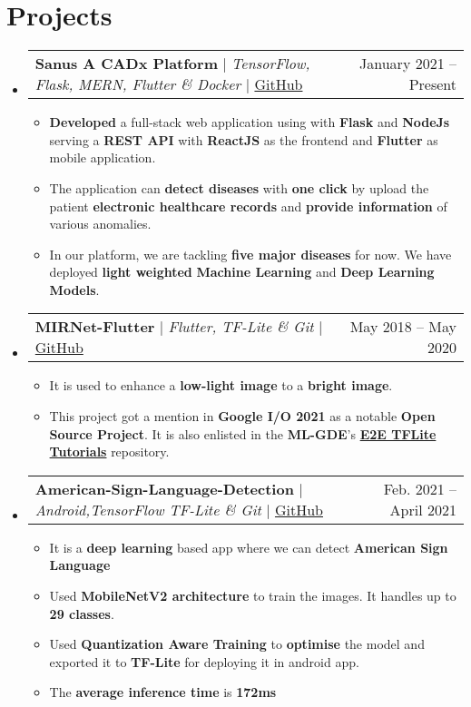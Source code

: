 \documentclass[letterpaper,11pt]{article}
\makeatletter
\newcommand{\resumeItem}[1]{
  \item\small{
    {#1 \vspace{-2pt}}
  }
}
\newcommand{\resumeProjectHeading}[2]{
    \item
    \begin{tabular*}{0.97\textwidth}{l@{\extracolsep{\fill}}r}
      \small#1 & #2 \\
    \end{tabular*}\vspace{-7pt}
}
\newcommand{\resumeSubHeadingListStart}{\begin{itemize}[leftmargin=0.15in, label={}]}
\newcommand{\resumeSubHeadingListEnd}{\end{itemize}}
\newcommand{\resumeItemListStart}{\begin{itemize}}
\newcommand{\resumeItemListEnd}{\end{itemize}\vspace{-5pt}}
\makeatother
\begin{document}
\section{Projects}
    \resumeSubHeadingListStart
      \resumeProjectHeading
          {\textbf{Sanus \- A CADx Platform } $|$ \emph{TensorFlow, Flask, MERN, Flutter \& Docker} $|$ \href{https://github.com/SANUS-ML/SANUS-WEB}{GitHub}}{January 2021 -- Present}
          \resumeItemListStart
            \resumeItem{\textbf{Developed} a full-stack web application using with \textbf{Flask} and \textbf{NodeJs} serving a \textbf{REST API} with \textbf{ReactJS} as the frontend and \textbf{Flutter} as mobile application.}
            \resumeItem{The application can \textbf{detect diseases} with \textbf{one click} by upload the patient \textbf{electronic healthcare records} and \textbf{provide information} of various anomalies.}
            \resumeItem{In our platform, we are tackling \textbf{five major diseases} for now. We have deployed \textbf{light weighted} \textbf{Machine Learning} and \textbf{Deep Learning Models}.}
          \resumeItemListEnd
      \resumeProjectHeading
          {\textbf{MIRNet-Flutter} $|$ \emph{Flutter, TF-Lite \& Git} $|$ \href{https://github.com/sayannath/MIRNet-Flutter}{GitHub}}{May 2018 -- May 2020}
          \resumeItemListStart
            \resumeItem{It is used to enhance a \textbf{low-light image} to a \textbf{bright image}.}
            \resumeItem{This project got a mention in \textbf{Google I/O 2021} as a notable \textbf{Open Source Project}. It is also enlisted in the \textbf{ML-GDE}'s \href{https://github.com/ml-gde/e2e-tflite-tutorials}{\textbf{E2E TFLite Tutorials}} repository.}
          \resumeItemListEnd
      \resumeProjectHeading
          {\textbf{American-Sign-Language-Detection} $|$ \emph{Android,TensorFlow TF-Lite \& Git} $|$ \href{https://github.com/sayannath/American-Sign-Language-Detection}{GitHub}}{Feb. 2021 -- April 2021}
          \resumeItemListStart
            \resumeItem{It is a \textbf{deep learning} based app where we can detect \textbf{American Sign Language}}
            \resumeItem{Used \textbf{MobileNetV2 architecture} to train the images. It handles up to \textbf{29 classes}.}
            \resumeItem{Used \textbf{Quantization Aware Training} to \textbf{optimise} the model and exported it to \textbf{TF-Lite} for deploying it in android app.}
            \resumeItem{The \textbf{average inference time} is \textbf{172ms}}
          \resumeItemListEnd
    \resumeSubHeadingListEnd

%
\end{document}
